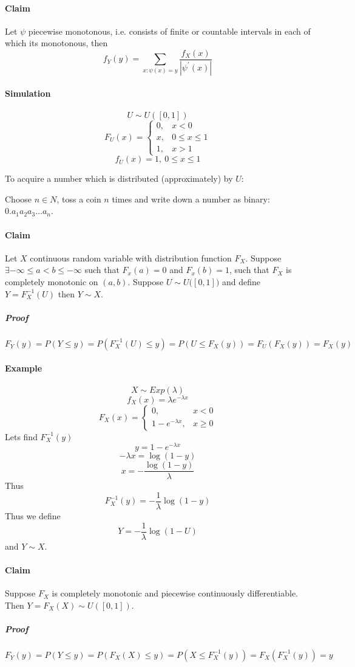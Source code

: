 \paragraph{Claim}
Let $\psi$ piecewise monotonous, i.e. consists of finite or countable intervals in each of which its monotonous, then
$$f_Y(y) = \sum_{x: \psi(x)=y} \frac{f_X(x)}{|\psi^\prime(x)|}$$

\paragraph{Simulation}
$$U \sim U \left( [0,1] \right)$$
$$F_U(x) = \begin{cases}
0,&x<0\\
x,&0\leq x\leq 1\\
1,&x>1
\end{cases}$$
$$f_U(x) = 1, \: 0\leq x \leq 1$$

To acquire a number which is distributed (approximately) by $U$:

Choose $n \in N$, toss a coin $n$ times and write down a number as binary:
$0.a_1a_2a_3\dots a_n$. 

\paragraph{Claim} Let $X$ continuous random variable with distribution function $F_X$. Suppose $\exists -\infty \leq a < b \leq -\infty$ such that $F_x(a) = 0 $ and $F_x(b) = 1$, such that $F_X$ is completely monotonic on $(a,b)$. Suppose $U \sim U\big( [0,1] \big)$ and define $Y  =F_X^{-1}(U)$ then $Y \sim X$.
\subparagraph{Proof}
$$F_Y(y) = P(Y \leq y)= P(F_X^{-1}(U) \leq y) = P(U \leq F_X(y)) = F_U(F_X(y)) = F_X(y)$$
\paragraph{Example}
$$X \sim Exp(\lambda)$$
$$f_X(x) = \lambda e^{-\lambda x}$$
$$F_X(x) = \begin{cases}
0,&x<0\\1-e^{-\lambda x},& x \geq 0
\end{cases}$$
Lets find $F^{-1}_X(y) $
$$y = 1-e^{-\lambda x}$$
$$-\lambda x = \log (1-y)$$
$$ x = -\frac{ \log (1-y)}{\lambda}$$
Thus
$$F^{-1}_X(y) =  -\frac{1}{\lambda} \log (1-y)$$
Thus we define
$$Y = -\frac{1}{\lambda} \log (1-U)$$
and $Y \sim X$.
\\

\paragraph{Claim} Suppose $F_X$ is completely monotonic and piecewise continuously differentiable. Then $Y=F_X(X) \sim U([0,1])$. 
\subparagraph{Proof}
$$F_Y(y) = P(Y \leq y)= P(F_X(X) \leq y) = P(X \leq F_X^{-1}(y)) = F_X(F_X^{-1}(y)) = y$$

